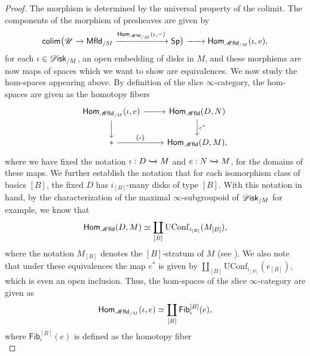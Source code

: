\documentclass[../text]{subfiles}
\begin{document}
\begin{proof}
    The morphism is determined by the universal property of the colimit. The components of the morphism of presheaves are given by
    \begin{equation}
        \mathsf{colim} \big( \mathscr{U} \xrightarrow{} \mfld[r]_{/M} \xrightarrow{\mathsf{Hom}_{\mfld_{/M}}(\iota, -)} \mathsf{Sp} \big) \xrightarrow{\ \ \ \ \ } \mathsf{Hom}_{\mfld_{/M}}(\iota, e),
    \end{equation}
    for each $\iota \in \disk_{/M}$, an open embedding of disks in $M$, and these morphisms are now maps of spaces which we want to show are equivalences. We now study the hom-spaces appearing above. By definition of the slice $\infty$-category, the hom-spaces are given as the homotopy fibers
    \begin{equation}
        \begin{tikzcd}
            \mathsf{Hom}_{\mfld_{/M}} (\iota, e) \arrow[d] \arrow[r] & \mathsf{Hom}_{\mfld}(D, N) \arrow[d, "e^*"] \\
            * \arrow[r, "\{\iota\}"] & \mathsf{Hom}_{\mfld}(D, M),
        \end{tikzcd}
    \end{equation}
    where we have fixed the notation $\iota: D \xhookrightarrow{} M$ and $e: N \xhookrightarrow{} M$, for the domains of these maps. We further establish the notation that for each isomorphism class of basics $[B]$, the fixed $D$ has $i_{[B]}$-many disks of type $[B]$. With this notation in hand, by the characterization of the maximal $\infty$-subgroupoid of $\disk_{/M}$ \cite[Lem.2.21]{aft_fhstrat} for example, we know that
    \begin{equation}
        \mathsf{Hom}_{\mfld}(D, M) \simeq \coprod_{[B]} \mathrm{UConf}_{i_{[B]}}(M_{[B]}),
    \end{equation}
    where the notation $M_{[B]}$ denotes the $[B]$-stratum of $M$ (see \cite[Prop.4.4.7]{aft_localstrut}). We also note that under these equivalences the map $e^*$ is given by $\coprod_{[B]} \mathrm{UConf}_{i_{[B]}}(e_{[B]})$, which is even an open inclusion. Thus, the hom-spaces of the slice $\infty$-category are given as 
    \begin{equation}
        \mathsf{Hom}_{\mfld_{/M}} (\iota, e) \simeq \coprod_{[B]} \mathsf{Fib}_\iota^{[B]}(e),
    \end{equation}
    where $\mathsf{Fib}_\iota^{[B]}(e)$ is defined as the homotopy fiber
    \begin{equation}

\end{equation}
\end{proof}
\end{document}
